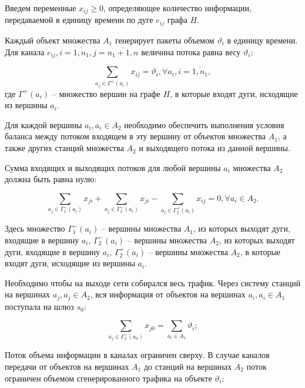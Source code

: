 Введем переменные $x_{ij} \geqslant 0$, определяющее количество информации, передаваемой в единицу времени по дуге $e_{ij}$ графа $H$.

Каждый объект множества $A_1$ генерирует пакеты объемом $\vartheta_i$ в единицу времени. Для канала $e_{ij}, i = \overline{1,n_1}, j = \overline{n_1+1,n}$ величина потока равна весу $\vartheta_i$:

\begin{equation}\label{eq:part2_1.1}
    \sum_{a_j \in \Gamma^+(a_i)} x_{ij} = \vartheta_i, \forall a_i, i=\overline{1, n_1},
\end{equation}
где $\Gamma^+(a_i)$ – множество вершин на графе $H$, в которые входят дуги, исходящие из вершины $a_i$. 

Для каждой вершины $a_i,  a_i \in A_2$ необходимо обеспечить выполнения условия баланса между потоком входящем в эту вершину от объектов множества $A_1$, а также других станций множества $A_2$ и выходящего потока из данной вершины. 

Сумма входящих и выходящих потоков для любой вершины $a_i$  множества $A_2$ должна быть равна нулю:

\begin{equation}\label{eq:part2_1.2}
    \sum_{a_j \in \Gamma_1^-(a_i)} x_{ji} + \sum_{a_j \in \Gamma_2^-(a_i)} x_{ji} -  \sum_{a_j \in \Gamma_2^+(a_i)} x_{ij} =0 ,\forall a_i \in A_2. 
\end{equation}

Здесь множество $\Gamma_1^-(a_i)$ – вершины множества $A_1$, из которых выходят дуги, входящие в вершину $a_i$, $\Gamma_2^-(a_i)$ – вершины множества $A_2$, из которых выходят дуги, входящие в  вершину $a_i$, $\Gamma_2^+(a_i)$ – вершины множества $A_2$, в которые входят дуги, исходящие из вершины $a_i$.


Необходимо чтобы на выходе сети собирался весь трафик. Через систему станций на вершинах $a_j, a_j \in A_2$, вся информация от объектов на вершинах $a_i, a_i \in A_1$ поступала  на шлюз $s_0$:

\begin{equation}\label{eq:part2_1.3}
    \sum_{a_j \in \Gamma_2^-(a_0)} x_{j0} =  \sum_{a_i \in A_1} \vartheta_i;
\end{equation}


Поток объема информации в каналах ограничен сверху. В случае каналов передачи от объектов на вершинах $A_1$ до станций на вершинах $A_2$ поток ограничен объемом сгенерированного трафика на объекте $\vartheta_i$:

